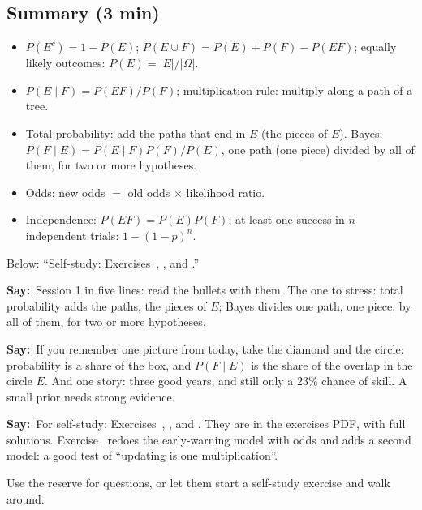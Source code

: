 \documentclass[11pt,a4paper,parskip=half]{scrartcl}
\newcommand{\Om}{\Omega}
\newcommand{\say}{\textbf{\color{teal}Say:}\ }
\begin{document}
\begin{printskip}
	\subsection{Summary (3 min)}

	\begin{onslide}
		\begin{itemize}[nosep]
			\item $P(E^c)=1-P(E)$; $P(E\cup F)=P(E)+P(F)-P(EF)$; equally likely
			      outcomes: $P(E)=|E|/|\Om|$.
			\item $P(E\mid F)=P(EF)/P(F)$; multiplication rule: multiply along a
			      path of a tree.
			\item Total probability: add the paths that end in $E$ (the pieces of
			      $E$). Bayes: $P(F\mid E)=P(E\mid F)P(F)/P(E)$, one path (one piece)
			      divided by all of them, for two or more hypotheses.
			\item Odds: new odds $=$ old odds $\times$ likelihood ratio.
			\item Independence: $P(EF)=P(E)P(F)$; at least one success in $n$
			      independent trials: $1-(1-p)^n$.
		\end{itemize}
		Below: ``Self-study: Exercises~,
		,  and
		.''
	\end{onslide}

	\say Session 1 in five lines: read the bullets with them. The one to
	stress: total probability adds the paths, the pieces of $E$; Bayes
	divides one path, one piece, by all of them, for two or more
	hypotheses.

	\say If you remember one picture from today, take the diamond and the
	circle: probability is a share of the box, and $P(F\mid E)$ is the share
	of the overlap in the circle $E$. And one story: three good years, and
	still only a 23\% chance of skill. A small prior needs strong evidence.

	\say For self-study: Exercises~,
	,  and
	. They are in the exercises PDF, with full
	solutions. Exercise~ redoes the early-warning
	model with odds and adds a second model: a good test of ``updating is
	one multiplication''.

	\begin{cue}
		Use the reserve for questions, or let them start a self-study
		exercise and walk around.
	\end{cue}
\end{printskip}
\end{document}

